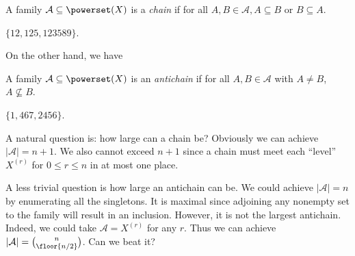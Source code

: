 \documentclass[a4paper]{article}
\begin{document}
\begin{definition}[chain]
  A family \(\mathcal A \subseteq \powerset (X)\) is a \emph{chain} if for all \(A, B \in \mathcal A, A \subseteq B \text{ or } B \subseteq A\).
\end{definition}

\begin{eg}
  \(\{12, 125, 123589\}\).
\end{eg}

On the other hand, we have

\begin{definition}[antichain]
  A family \(\mathcal A \subseteq \powerset (X)\) is an \emph{antichain} if for all \(A, B \in \mathcal A\) with \(A \neq B\), \(A \nsubseteq B\).
\end{definition}

\begin{eg}
  \(\{1, 467, 2456\}\).
\end{eg}

A natural question is: how large can a chain be? Obviously we can achieve \(|\mathcal A| = n + 1\). We also cannot exceed \(n + 1\) since a chain must meet each ``level'' \(X^{(r)}\) for \(0 \leq r \leq n\) in at most one place.

A less trivial question is how large an antichain can be. We could achieve \(|\mathcal A| = n\) by enumerating all the singletons. It is maximal since adjoining any nonempty set to the family will result in an inclusion. However, it is not the largest antichain. Indeed, we could take \(\mathcal A = X^{(r)}\) for any \(r\). Thus we can achieve \(|\mathcal A| = \binom{n}{\floor{n/2}}\). Can we beat it?

\printindex
\end{document}
